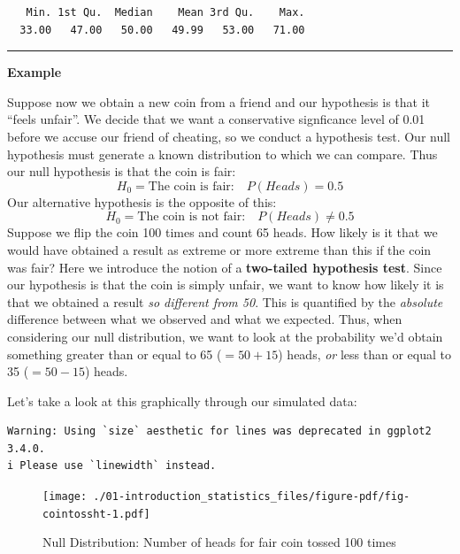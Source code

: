 \documentclass[
  letterpaper,
  DIV=11,
  numbers=noendperiod]{scrreprt}
\begin{document}
\begin{verbatim}
   Min. 1st Qu.  Median    Mean 3rd Qu.    Max. 
  33.00   47.00   50.00   49.99   53.00   71.00 
\end{verbatim}

\begin{center}\rule{0.5\linewidth}{0.5pt}\end{center}

\textbf{Example}

Suppose now we obtain a new coin from a friend and our hypothesis is
that it ``feels unfair''. We decide that we want a conservative
signficance level of 0.01 before we accuse our friend of cheating, so we
conduct a hypothesis test. Our null hypothesis must generate a known
distribution to which we can compare. Thus our null hypothesis is that
the coin is fair: \[H_0 = \text{The coin is fair:}\quad P(Heads) = 0.5\]
Our alternative hypothesis is the opposite of this:
\[H_0 = \text{The coin is not fair:}\quad P(Heads) \neq 0.5\] Suppose we
flip the coin 100 times and count 65 heads. How likely is it that we
would have obtained a result as extreme or more extreme than this if the
coin was fair? Here we introduce the notion of a \textbf{two-tailed
hypothesis test}. Since our hypothesis is that the coin is simply
unfair, we want to know how likely it is that we obtained a result
\emph{so different from 50}. This is quantified by the \emph{absolute}
difference between what we observed and what we expected. Thus, when
considering our null distribution, we want to look at the probability
we'd obtain something greater than or equal to 65 (\(=50+15\)) heads,
\emph{or} less than or equal to 35 (\(=50-15\)) heads.

Let's take a look at this graphically through our simulated data:

\begin{verbatim}
Warning: Using `size` aesthetic for lines was deprecated in ggplot2 3.4.0.
i Please use `linewidth` instead.
\end{verbatim}

\begin{figure}

{\centering \texttt{[image: ./01-introduction\_statistics\_files/figure-pdf/fig-cointossht-1.pdf]}

}

\caption{\label{fig-cointossht}Null Distribution: Number of heads for
fair coin tossed 100 times}

\end{figure}
\end{document}
